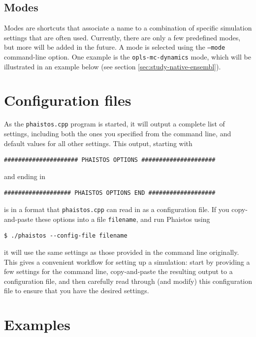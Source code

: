 \documentclass[11pt,a4paper,twoside]{book}
\begin{document}
\subsection{Modes}
\label{sec:modes}

Modes are shortcuts that associate a name to a combination of specific
simulation settings that are often used. Currently, there are only a
few predefined modes, but more will be added in the future. A mode is
selected using the \texttt{--mode} command-line option. One example is
the \texttt{opls-mc-dynamics} mode, which will be illustrated in an
example below (see section \ref{sec:study-native-ensembl}).


\section{Configuration files}
\label{sec:configuration-files}

As the \texttt{phaistos.cpp} program is started, it will output a complete list of
settings, including both the ones you specified from the command line,
and default values for all other settings. This output, starting with

\begin{verbatim}
##################### PHAISTOS OPTIONS #####################
\end{verbatim} 

\noindent
and ending in

\begin{verbatim}
################### PHAISTOS OPTIONS END ###################
\end{verbatim}

\noindent
is in a format that \texttt{phaistos.cpp} can read in as a configuration file. If you
copy-and-paste these options into a file \texttt{filename}, and run Phaistos using

\begin{verbatim}
$ ./phaistos --config-file filename
\end{verbatim}

\noindent
it will use the same settings as those provided in the command line
originally. This gives a convenient workflow for setting up a
simulation: start by providing a few settings for the command line,
copy-and-paste the resulting output to a configuration file, and then
carefully read through (and modify) this configuration file to ensure
that you have the desired settings.


\section{Examples}
\label{sec:examples-simulations}
\end{document}
